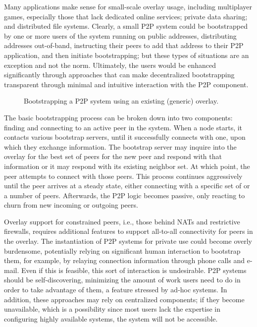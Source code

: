 Many applications make sense for small-scale overlay usage, including
multiplayer games, especially those that lack dedicated online services;
private data sharing; and distributed file systems.  Clearly, a small P2P
system could be bootstrapped by one or more users of the system running on
public addresses, distributing addresses out-of-band, instructing their peers
to add that address to their P2P application, and then initiate bootstrapping;
but these types of situations are an exception and not the norm.  Ultimately,
the users would be enhanced significantly through approaches that can make
decentralized bootstrapping transparent through minimal and intuitive
interaction with the P2P component.

\begin{figure}
\centering
{}
\caption{Bootstrapping a P2P system using an existing (generic) overlay.}
\label{fig:bootstrap}
\end{figure}

The basic bootstrapping process can be broken down into two components: finding
and connecting to an active peer in the system.  When a node starts, it
contacts various bootstrap servers, until it successfully connects with one,
upon which they exchange information.  The bootstrap server may inquire into
the overlay for the best set of peers for the new peer and respond with that
information or it may respond with its existing neighbor set.  At which point,
the peer attempts to connect with those peers.  This process continues
aggressively until the peer arrives at a steady state, either connecting with a
specific set of or a number of peers.  Afterwards, the P2P logic becomes
passive, only reacting to churn from new incoming or outgoing peers.

Overlay support for constrained peers, i.e., those behind NATs and restrictive
firewalls, requires additional features to support all-to-all connectivity for
peers in the overlay.  The instantiation of P2P systems for private use could
become overly burdensome, potentially relying on significant human interaction
to bootstrap them, for example, by relaying connection information through
phone calls and e-mail.  Even if this is feasible, this sort of interaction is
undesirable.  P2P systems should be self-discovering, minimizing the amount of
work users need to do in order to take advantage of them, a feature stressed by
ad-hoc systems.  In addition, these approaches may rely on centralized
components; if they become unavailable, which is a possibility since most users
lack the expertise in configuring highly available systems, the system will not
be accessible.

